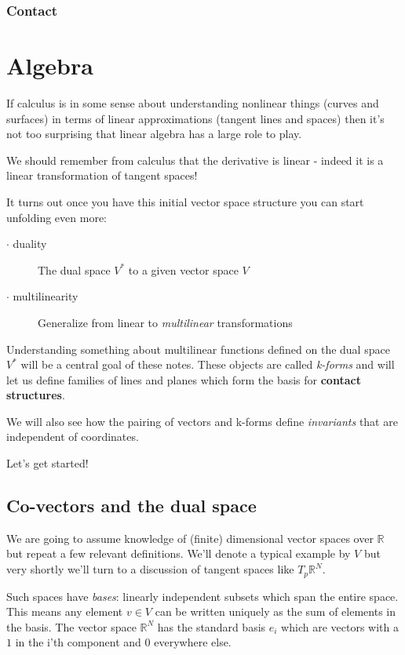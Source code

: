 \documentclass{article}
\begin{document}
\subsubsection {Contact}

\section {Algebra}

If calculus is in some sense about understanding nonlinear things (curves and
surfaces) in terms of linear approximations (tangent lines and spaces) then it's
not too surprising that linear algebra has a large role to play.

We should remember from calculus that the derivative is linear - indeed it is a
linear transformation of tangent spaces!

It turns out once you have this initial vector space structure you can start
unfolding even more:

\begin{description}
\item[$\cdot$ duality       ] The dual space $V^{*}$ to a given vector space $V$
\item[$\cdot$ multilinearity] Generalize from linear to \textsl{multilinear} transformations 
\end{description}

Understanding something about multilinear functions defined on the dual space
$V^{*}$ will be a central goal of these notes. These objects are called
\textsl{k-forms} and will let us define families of lines and planes which form
the basis for \textbf{contact structures}.

We will also see how the pairing of vectors and k-forms define
\textsl{invariants} that are independent of coordinates.

Let's get started!

\subsection {Co-vectors and the dual space}

We are going to assume knowledge of (finite) dimensional vector spaces over
$\mathbb{R}$ but repeat a few relevant definitions. We'll
denote a typical example by $V$ but very shortly we'll turn to a discussion of
tangent spaces like $T_{p}\mathbb{R}^{N}$.

Such spaces have \textsl{bases}: linearly independent subsets which span the
entire space. This means any element $v \in V$ can be written uniquely as the
sum of elements in the basis. The vector space $\mathbb{R}^{N}$ has the standard basis $e_{i}$
which are vectors with a $1$ in the i'th component and $0$ everywhere else.
\end{document}
